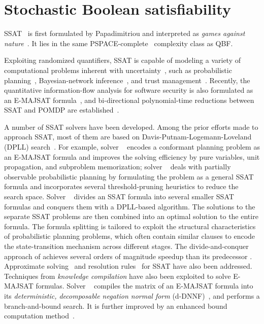 \section{Stochastic Boolean satisfiability}
\label{sect:related-work-ssat}

SSAT~\cite{Littman2001,SATHandbook-SSAT} is first formulated by Papadimitriou
and interpreted as \textit{games against nature}~\cite{Papadimitriou1985}.
It lies in the same PSPACE-complete~\cite{Stockmeyer1973} complexity class as QBF.

Exploiting randomized quantifiers,
SSAT is capable of modeling a variety of computational problems inherent with uncertainty~\cite{Hnich2011},
such as probabilistic planning~\cite{Kushmerick1995,Littman1998},
Bayesian-network inference~\cite{Cooper1990,Jensen1996,Dechter1998,Bacchus2003},
and trust management~\cite{SATHandbook-SSAT}.
Recently, the quantitative information-flow analysis for software security is also formulated
as an E-MAJSAT formula~\cite{Fremont2017},
and bi-directional polynomial-time reductions between SSAT and POMDP are established~\cite{Salmon2020}.

A number of SSAT solvers have been developed.
Among the prior efforts made to approach SSAT,
most of them are based on Davis-Putnam-Logemann-Loveland (DPLL) search~\cite{Davis1962}.
For example,
solver \maxplan~\cite{Majercik1998} encodes a conformant planning problem as an E-MAJSAT formula
and improves the solving efficiency by pure variables, unit propagation, and subproblem memorization;
solver \zander~\cite{Majercik2003} deals with partially observable probabilistic planning by formulating the problem as a general SSAT formula and incorporates several threshold-pruning heuristics to reduce the search space.
Solver \dcssat~\cite{Majercik2005} divides an SSAT formula into several smaller SSAT formulas and conquers them with a DPLL-based algorithm.
The solutions to the separate SSAT problems are then combined into an optimal solution to the entire formula.
The formula splitting is tailored to exploit the structural characteristics of probabilistic planning problems,
which often contain similar clauses to encode the state-transition mechanism across different stages.
The divide-and-conquer approach of \dcssat achieves several orders of magnitude speedup than its predecessor \zander.
Approximate solving~\cite{Majercik2007} and resolution rules~\cite{Teige2010} for SSAT have also been addressed.
Techniques from \textit{knowledge compilation} have also been exploited to solve E-MAJSAT formulas.
Solver \complan~\cite{Huang2006} compiles the matrix of an E-MAJSAT formula into its
\textit{deterministic, decomposable negation normal form} (d-DNNF)~\cite{Darwiche2001,Darwiche2002dDNNF},
and performs a branch-and-bound search.
It is further improved by an enhanced bound computation method~\cite{Pipatsrisawat2009}.